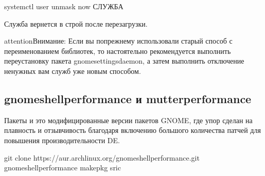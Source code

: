 \documentclass[letterpaper,10pt,russian,openany]{sphinxmanual}
\begin{document}
\begin{sphinxVerbatim}[commandchars=\\\{\}]
systemctl \PYGZhy{}\PYGZhy{}user unmask \PYGZhy{}\PYGZhy{}now СЛУЖБА
\end{sphinxVerbatim}

\sphinxAtStartPar
Служба вернется в строй после перезагрузки.

\begin{sphinxadmonition}{attention}{Внимание:}
\sphinxAtStartPar
Если вы по\sphinxhyphen{}прежнему использовали старый способ с переименованием библиотек,
то настоятельно рекомендуется выполнить переустановку пакета gnome\sphinxhyphen{}settings\sphinxhyphen{}daemon, а
затем выполнить отключение ненужных вам служб уже новым способом.
\end{sphinxadmonition}

\ignorespaces 

\subsection{gnome\sphinxhyphen{}shell\sphinxhyphen{}performance и mutter\sphinxhyphen{}performance}
\label{\detokenize{source/de-optimizations:gnome-shell-performance-mutter-performance}}\label{\detokenize{source/de-optimizations:gnome-shell-and-mutter-performance}}\label{\detokenize{source/de-optimizations:index-5}}
\sphinxAtStartPar
Пакеты 
и  \sphinxhyphen{}
это модифицированные версии пакетов GNOME, где упор сделан на плавность и отзывчивость благодаря включению большого количества патчей для повышения производительности DE.

\sphinxAtStartPar
{}

\begin{sphinxVerbatim}[commandchars=\\\{\}]
git clone https://aur.archlinux.org/gnome\PYGZhy{}shell\PYGZhy{}performance.git 
 gnome\PYGZhy{}shell\PYGZhy{}performance                                      
makepkg \PYGZhy{}sric                                                   
\end{sphinxVerbatim}
\end{document}
